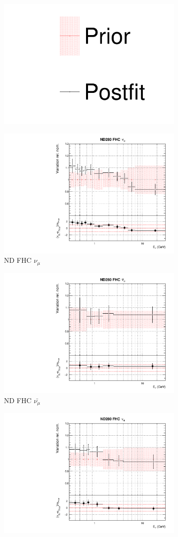 \begin{figure}[!htbp]
\centering
\begin{subfigure}{0.8\textwidth}
  \centering
  \includegraphics[width=0.24\linewidth]{figs/dat_leg}
\end{subfigure}
\begin{subfigure}{0.45\textwidth}
  \centering
  \includegraphics[width=0.75\linewidth]{figs/datflux0}
  \caption{ND FHC $\nu_{\mu}$}
\end{subfigure}
\begin{subfigure}{0.45\textwidth}
  \centering
  \includegraphics[width=0.75\linewidth]{figs/datflux1}
  \caption{ND FHC $\bar{\nu_{\mu}}$}
\end{subfigure}
\begin{subfigure}{0.45\textwidth}
  \centering
  \includegraphics[width=0.75\linewidth]{figs/datflux2}

\end{subfigure}
\end{figure}

